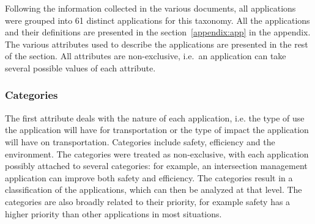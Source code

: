 Following the information collected in the various documents, all applications were grouped into 61 distinct applications for this taxonomy. All the applications and their definitions are presented in the section~\ref{appendix:app} in the appendix. 
The various attributes used to describe the applications are presented in the rest of the section. All attributes are non-exclusive, i.e.\ an application can take several possible values of each attribute. 


\subsubsection{Categories}
The first attribute deals with the nature of each application, i.e. the type of use the application will have for transportation or the type of impact the application will have on transportation. Categories include safety, efficiency and the environment. The categories were treated as non-exclusive, with each application possibly attached to several categories: for example, an intersection management application can improve both safety and efficiency. The categories result in a classification of the applications, which can then be analyzed at that level. The categories are also broadly related to their priority, for example safety has a higher priority than other applications in most situations. 





